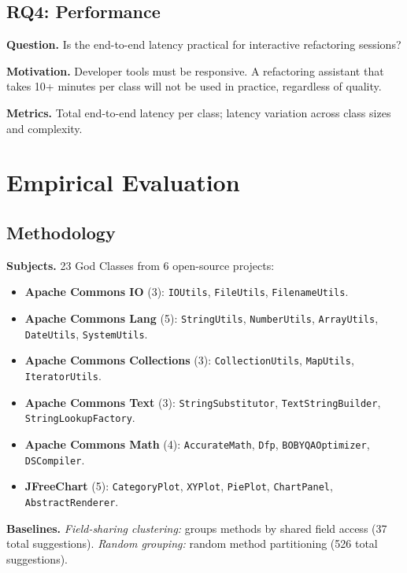 \documentclass[sigconf]{acmart}
\begin{document}
\subsection{RQ4: Performance}

\textbf{Question.}  Is the end-to-end latency practical for interactive
refactoring sessions?

\textbf{Motivation.}  Developer tools must be responsive. A refactoring
assistant that takes 10+ minutes per class will not be used in practice,
regardless of quality.

\textbf{Metrics.}  Total end-to-end latency per class; latency variation across
class sizes and complexity.

\section{Empirical Evaluation}
\label{sec:eval}

\subsection{Methodology}
\label{sec:methodology}

\textbf{Subjects.}  23 God Classes from 6 open-source projects:
\begin{itemize}
  \item \textbf{Apache Commons IO} (3): \texttt{IOUtils}, \texttt{FileUtils},
        \texttt{FilenameUtils}.
  \item \textbf{Apache Commons Lang} (5): \texttt{StringUtils},
        \texttt{NumberUtils}, \texttt{ArrayUtils}, \texttt{DateUtils},
        \texttt{SystemUtils}.
  \item \textbf{Apache Commons Collections} (3): \texttt{CollectionUtils},
        \texttt{MapUtils}, \texttt{IteratorUtils}.
  \item \textbf{Apache Commons Text} (3): \texttt{StringSubstitutor},
        \texttt{TextStringBuilder}, \texttt{StringLookupFactory}.
  \item \textbf{Apache Commons Math} (4): \texttt{AccurateMath}, \texttt{Dfp},
        \texttt{BOBYQAOptimizer}, \texttt{DSCompiler}.
  \item \textbf{JFreeChart} (5): \texttt{CategoryPlot}, \texttt{XYPlot},
        \texttt{PiePlot}, \texttt{ChartPanel}, \texttt{AbstractRenderer}.
\end{itemize}

\textbf{Baselines.}  \emph{Field-sharing clustering:} groups methods by shared
field access (37 total suggestions). \emph{Random grouping:} random method
partitioning (526 total suggestions).
\end{document}
